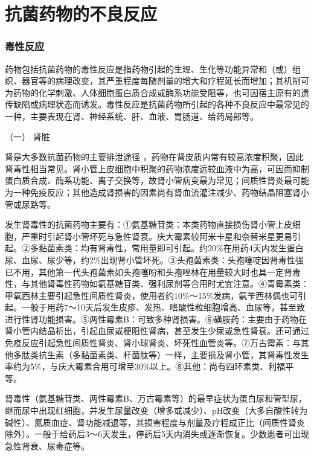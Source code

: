 \protect\hypertarget{text00436.html}{}{}

\section{抗菌药物的不良反应}

\subsubsection{毒性反应}

药物包括抗菌药物的毒性反应是指药物引起的生理、生化等功能异常和（或）组织、器官等的病理改变，其严重程度每随剂量的增大和疗程延长而增加；其机制可为药物的化学刺激、人体细胞蛋白质合成或酶系功能受阻等，也可因宿主原有的遗传缺陷或病理状态而诱发。毒性反应是抗菌药物所引起的各种不良反应中最常见的一种，主要表现在肾、神经系统、肝、血液、胃肠道、给药局部等。

\hypertarget{text00436.htmlux5cux23CHP17-7-7-1-1}{}
（一） 肾脏

肾是大多数抗菌药物的主要排泄途径
，药物在肾皮质内常有较高浓度积聚，因此肾毒性相当常见。肾小管上皮细胞中积聚的药物浓度远较血液中为高，可因而抑制蛋白质合成、酶系功能、离子交换等，故肾小管病变最为常见；间质性肾炎最可能为一种免疫反应；其他造成肾损害的因素尚有肾血流灌注减少、药物结晶阻塞肾小管或尿路等。

发生肾毒性的抗菌药物主要有：①氨基糖苷类：本类药物直接损伤肾小管上皮细胞，严重时引起肾小管坏死与急性肾衰。庆大霉素较阿米卡星和奈替米星更易引起。②多黏菌素类：均有肾毒性，常用量即可引起。约20\%在用药4天内发生蛋白尿、血尿、尿少等，约2\%出现肾小管坏死。③头孢菌素类：头孢噻啶因肾毒性强已不用，其他第一代头孢菌素如头孢噻吩和头孢唑林在用量较大时也具一定肾毒性，与其他肾毒性药物如氨基糖苷类、强利尿剂等合用时尤宜注意。④青霉素类：甲氧西林主要引起急性间质性肾炎，使用者约10\%～15\%发病，氨苄西林偶也可引起。一般于用药7～10天后发生皮疹、发热、嗜酸性粒细胞增高、血尿等，甚至致进行性肾功能损害。⑤两性霉素B：可致多种肾损害。⑥磺胺药：主要由于药物在肾小管内结晶析出，引起血尿或梗阻性肾病，甚至发生少尿或急性肾衰。还可通过免疫反应引起急性间质性肾炎、肾小球肾炎、坏死性血管炎等。⑦万古霉素：与其他多肽类抗生素（多黏菌素类、杆菌肽等）一样，主要损及肾小管，其肾毒性发生率约为5\%，与庆大霉素合用可增至30\%以上。⑧其他：尚有四环素类、利福平等。

肾毒性（氨基糖苷类、两性霉素B、万古霉素等）的最早症状为蛋白尿和管型尿，继而尿中出现红细胞，并发生尿量改变（增多或减少）、pH改变（大多自酸性转为碱性）、氮质血症、肾功能减退等，其损害程度与剂量及疗程成正比（间质性肾炎除外）。一般于给药后3～6天发生，停药后5天内消失或逐渐恢复。少数患者可出现急性肾衰、尿毒症等。

